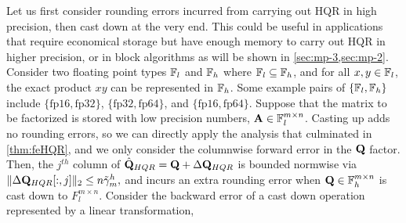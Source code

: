 Let us first consider rounding errors incurred from carrying out HQR in high precision, then cast down at the very end.
This could be useful in applications that require economical storage but have enough memory to carry out HQR in higher precision, or in block algorithms as will be shown in \cref{sec:mp-3,sec:mp-2}.
Consider two floating point types $\mathbb{F}_{l}$ and $\mathbb{F}_{h}$ where $\mathbb{F}_{l}\subseteq \mathbb{F}_{h}$, and for all $x,y\in\mathbb{F}_{l}$, the exact product $xy$ can be represented in $\mathbb{F}_{h}$.
Some example pairs of $\{\mathbb{F}_{l}, \mathbb{F}_{h}\}$ include $\{\text{fp16}, \text{fp32}\}$, $\{\text{fp32}, \text{fp64}\}$, and $\{\text{fp16}, \text{fp64}\}$.
Suppose that the matrix to be factorized is stored with low precision numbers, $\mathbf{A}\in\mathbb{F}_{l}^{m\times n}$.
Casting up adds no rounding errors, so we can directly apply the analysis that culminated in \cref{thm:feHQR}, and we only consider the columnwise forward error in the $\mathbf{Q}$ factor.
Then, the $j^{th}$ column of $\hat{\mathbf{Q}}_{HQR} = \mathbf{Q} + \Delta \mathbf{Q}_{HQR}$ is bounded normwise via $\|\Delta \mathbf{Q}_{HQR}[:,j]\|_2 \leq n\tilde{\gamma}_{m}^{h},$ and incurs an extra rounding error when $\mathbf{Q}\in\mathbb{F}_{h}^{m\times n}$ is cast down to $F_{l}^{m\times n}$.
Consider the backward error of a cast down operation represented by a linear transformation, 


